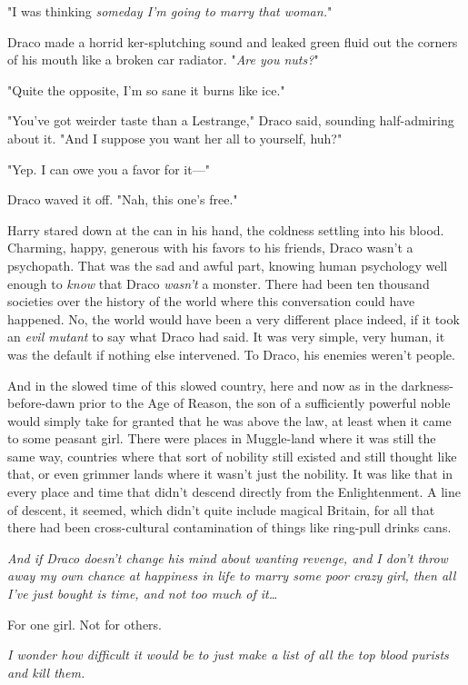 "I was thinking \emph{someday I'm going to marry that woman.}"

Draco made a horrid ker-splutching sound and leaked green fluid out the corners 
of his mouth like a broken car radiator. "\emph{Are you nuts?}"

"Quite the opposite, I'm so sane it burns like ice."

"You've got weirder taste than a Lestrange," Draco said, sounding half-admiring 
about it. "And I suppose you want her all to yourself, huh?"

"Yep. I can owe you a favor for it---"

Draco waved it off. "Nah, this one's free."

Harry stared down at the can in his hand, the coldness settling into his blood. 
Charming, happy, generous with his favors to his friends, Draco wasn't a 
psychopath. That was the sad and awful part, knowing human psychology well 
enough to \emph{know} that Draco \emph{wasn't} a monster. There had been ten 
thousand societies over the history of the world where this conversation could 
have happened. No, the world would have been a very different place indeed, if 
it took an \emph{evil mutant} to say what Draco had said. It was very simple, 
very human, it was the default if nothing else intervened. To Draco, his 
enemies weren't people.

And in the slowed time of this slowed country, here and now as in the 
darkness-before-dawn prior to the Age of Reason, the son of a sufficiently 
powerful noble would simply take for granted that he was above the law, at 
least when it came to some peasant girl. There were places in Muggle-land where 
it was still the same way, countries where that sort of nobility still existed 
and still thought like that, or even grimmer lands where it wasn't just the 
nobility. It was like that in every place and time that didn't descend directly 
from the Enlightenment. A line of descent, it seemed, which didn't quite 
include magical Britain, for all that there had been cross-cultural 
contamination of things like ring-pull drinks cans.

\emph{And if Draco doesn't change his mind about wanting revenge, and I don't 
throw away my own chance at happiness in life to marry some poor crazy girl, 
then all I've just bought is time, and not too much of it{\ldots}}

For one girl. Not for others.

\emph{I wonder how difficult it would be to just make a list of all the top 
blood purists and kill them.}

